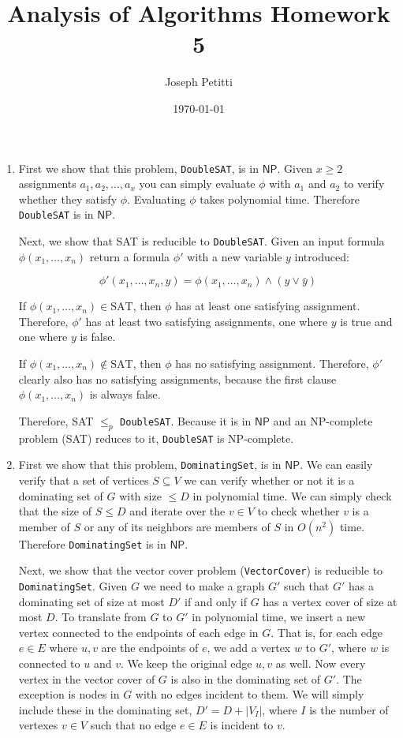 \documentclass[a4paper, 10pt]{article}
\title{Analysis of Algorithms Homework 5}
\author{Joseph Petitti}
\date{\today}
\begin{document}
\maketitle

\begin{enumerate}
	\item First we show that this problem, \texttt{DoubleSAT}, is in
		$\mathsf{NP}$. Given $x \ge 2$ assignments $a_1, a_2, \dots , a_x$ you
		can simply evaluate $\phi$ with $a_1$ and $a_2$ to verify whether they
		satisfy $\phi$. Evaluating $\phi$ takes polynomial time. Therefore
		\texttt{DoubleSAT} is in $\mathsf{NP}$.

		Next, we show that SAT is reducible to \texttt{DoubleSAT}. Given an
		input formula $\phi(x_1, \dots, x_n)$ return a formula $\phi'$ with a
		new variable $y$ introduced:
		
		$$\phi'(x_1, \dots, x_n, y) = \phi(x_1, \dots, x_n) \land (y \lor \bar
		y)$$ 

		If $\phi(x_1, \dots, x_n) \in \mathrm{SAT}$, then $\phi$ has at least
		one satisfying assignment. Therefore, $\phi'$ has at least two
		satisfying assignments, one where $y$ is true and one where $y$ is
		false.

		If $\phi(x_1, \dots, x_n) \notin \mathrm{SAT}$, then $\phi$ has no
		satisfying assignment. Therefore, $\phi'$ clearly also has no
		satisfying assignments, because the first clause $\phi(x_1, \dots, x_n)$
		is always false.

		Therefore, SAT $\le_p$ \texttt{DoubleSAT}. Because it is in
		$\mathsf{NP}$ and an NP-complete problem (SAT) reduces to it,
		\texttt{DoubleSAT} is NP-complete.

	\item First we show that this problem, \texttt{DominatingSet}, is in
		$\mathsf{NP}$. We can easily verify that a set of vertices $S \subseteq
		V$ we can verify whether or not it is a dominating set of $G$ with size
		$\le D$ in polynomial time. We can simply check that the size of $S \le
		D$ and iterate over the $v \in V$ to check whether $v$ is a member of
		$S$ or any of its neighbors are members of $S$ in $O(n^2)$ time.
		Therefore \texttt{DominatingSet} is in $\mathsf{NP}$.

		Next, we show that the vector cover problem (\texttt{VectorCover}) is
		reducible to \texttt{DominatingSet}.  Given $G$ we need to make a graph
		$G'$ such that $G'$ has a dominating set of size at most $D'$ if and
		only if $G$ has a vertex cover of size at most $D$. To translate from
		$G$ to $G'$ in polynomial time, we insert a new vertex connected to the
		endpoints of each edge in $G$. That is, for each edge $e \in E$ where
		$u, v$ are the endpoints of $e$, we add a vertex $w$ to $G'$, where $w$
		is connected to $u$ and $v$. We keep the original edge $u, v$ as well.
		Now every vertex in the vector cover of $G$ is also in the dominating
		set of $G'$. The exception is nodes in $G$ with no edges incident to
		them. We will simply include these in the dominating set, $D' = D +
		|V_I|$, where $I$ is the number of vertexes $v \in V$ such that no edge
		$e \in E$ is incident to $v$.


\end{enumerate}
\end{document}
